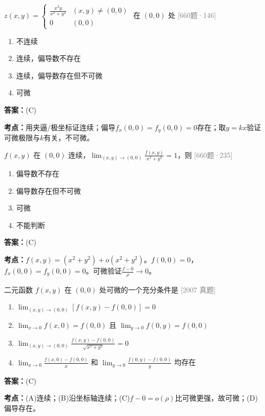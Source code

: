 \documentclass[12pt,a4paper]{ctexbook}
\newcommand{\src}[1]{\hfill\textcolor{gray}{\small\textsf{[#1]}}}
\newcommand{\ans}[1]{\begin{answerbox}\textbf{答案：}#1\end{answerbox}}
\newcommand{\kpt}[1]{\textbf{考点：}#1}
\begin{document}
\bigskip

\begin{exercise}[660题·分段函数可微性]
$z(x,y)=\begin{cases}\frac{x^2y}{x^2+y^2}&(x,y)\neq(0,0)\\0&(0,0)\end{cases}$ 在 $(0,0)$ 处 \hfill\src{660题·146}
\begin{enumerate}[label=(\Alph*),nosep]
  \item 不连续
  \item 连续，偏导数不存在
  \item 连续，偏导数存在但不可微
  \item 可微
\end{enumerate}
\end{exercise}
\ans{(C)}
\kpt{用夹逼/极坐标证连续；偏导$f_x(0,0)=f_y(0,0)=0$存在；取$y=kx$验证可微极限与$k$有关，不可微。}

\bigskip

\begin{exercise}[660题·抽象函数可微判定]
$f(x,y)$ 在 $(0,0)$ 连续，$\lim_{(x,y)\to(0,0)}\frac{f(x,y)}{x^2+y^2}=1$，则 \hfill\src{660题·235}
\begin{enumerate}[label=(\Alph*),nosep]
  \item 偏导数不存在
  \item 偏导数存在但不可微
  \item 可微
  \item 不能判断
\end{enumerate}
\end{exercise}
\ans{(C)}
\kpt{$f(x,y)=(x^2+y^2)+o(x^2+y^2)$。$f(0,0)=0$，$f_x(0,0)=f_y(0,0)=0$。可微验证$\frac{f-0}{\rho}\to 0$。}

\bigskip

\begin{exercise}
二元函数 $f(x,y)$ 在 $(0,0)$ 处可微的一个充分条件是 \hfill\src{2007 真题}
\begin{enumerate}[label=(\Alph*),nosep]
  \item $\lim_{(x,y)\to(0,0)}[f(x,y)-f(0,0)]=0$
  \item $\lim_{x\to 0}f(x,0)=f(0,0)$ 且 $\lim_{y\to 0}f(0,y)=f(0,0)$
  \item $\lim_{(x,y)\to(0,0)}\frac{f(x,y)-f(0,0)}{\sqrt{x^2+y^2}}=0$
  \item $\lim_{x\to 0}\frac{f(x,0)-f(0,0)}{x}$ 和 $\lim_{y\to 0}\frac{f(0,y)-f(0,0)}{y}$ 均存在
\end{enumerate}
\end{exercise}
\ans{(C)}
\kpt{(A)连续；(B)沿坐标轴连续；(C)$f-0=o(\rho)$比可微更强，故可微；(D)偏导存在。}
\end{document}
